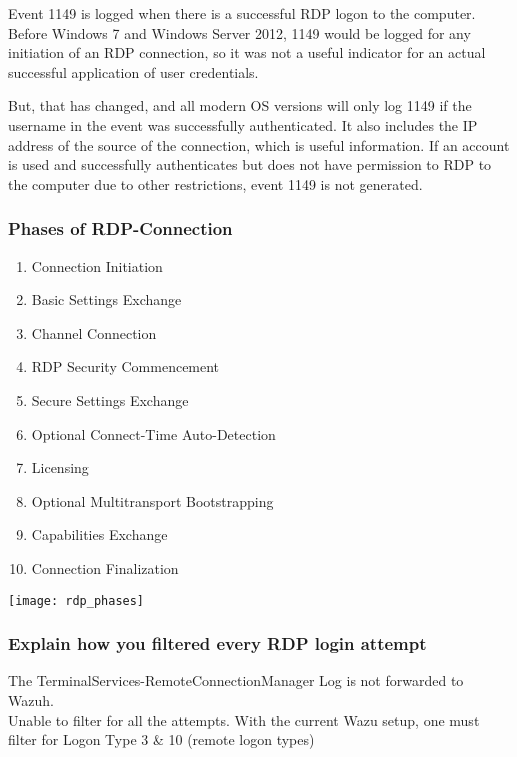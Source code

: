Event 1149 is logged when there is a successful RDP logon to the computer. Before Windows 7 and Windows Server 2012, 1149 would be logged for any initiation of an RDP connection, so it was not a useful indicator for an actual successful application of user credentials.

But, that has changed, and all modern OS versions will only log 1149 if the username in the event was successfully authenticated. It also includes the IP address of the source of the connection, which is useful information. If an account is used and successfully authenticates but does not have
permission to RDP to the computer due to other restrictions, event 1149 is not generated.


\subsubsection{Phases of RDP-Connection}

\begin{minipage}{0.45\linewidth}
    \begin{enumerate}
        \item Connection Initiation
        \item Basic Settings Exchange
        \item Channel Connection
        \item RDP Security Commencement
        \item Secure Settings Exchange
        \item Optional Connect-Time Auto-Detection
        \item Licensing
        \item Optional Multitransport Bootstrapping
        \item Capabilities Exchange
        \item Connection Finalization
    \end{enumerate}
\end{minipage}
\begin{minipage}{0.5\linewidth}
    \begin{center}
        \texttt{[image: rdp\_phases]}
        \vspace{-8pt}
    \end{center}
\end{minipage}

\subsubsection{Explain how you filtered every RDP login attempt}
The TerminalServices-RemoteConnectionManager Log is not forwarded to Wazuh.\\
Unable to filter for all the attempts.
With the current Wazu setup, one must filter for Logon Type 3 \& 10 (remote logon types)\\

